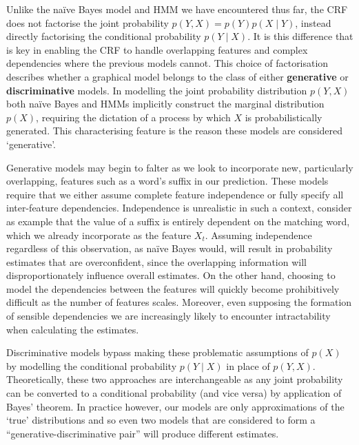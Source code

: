\documentclass[../main.tex]{subfiles}
\begin{document}

Unlike the na{\"i}ve Bayes model and HMM we have encountered thus far, the CRF does not factorise the joint probability $p(Y,X) = p(Y)p(X \mid Y)$, instead directly factorising the conditional probability $p(Y \mid X)$.
It is this difference that is key in enabling the CRF to handle overlapping features and complex dependencies where the previous models cannot.
This choice of factorisation describes whether a graphical model belongs to the class of either \textbf{generative} or \textbf{discriminative} models.
In modelling the joint probability distribution $p(Y,X)$ both na{\"i}ve Bayes and HMMs implicitly construct the marginal distribution $p(X)$, requiring the dictation of a process by which $X$ is probabilistically generated. This characterising feature is the reason these models are considered `generative'.

Generative models may begin to falter as we look to incorporate new, particularly overlapping, features such as a word's suffix in our prediction.
These models require that we either assume complete feature independence or fully specify all inter-feature dependencies.
Independence is unrealistic in such a context, consider as example that the value of a suffix is entirely dependent on the matching word, which we already incorporate as the feature $X_t$.
Assuming independence regardless of this observation, as na{\"i}ve Bayes would, will result in probability estimates that are overconfident, since the overlapping information will disproportionately influence overall estimates.
On the other hand, choosing to model the dependencies between the features will quickly become prohibitively difficult as the number of features scales. Moreover, even supposing the formation of sensible dependencies we are increasingly likely to encounter intractability when calculating the estimates.

Discriminative models bypass making these problematic assumptions of $p(X)$ by modelling the conditional probability $p(Y \mid X)$ in place of $p(Y,X)$.
Theoretically, these two approaches are interchangeable as any joint probability can be converted to a conditional probability (and vice versa) by application of Bayes' theorem.
In practice however, our models are only approximations of the `true' distributions and so even two models that are considered to form a ``generative-discriminative pair'' \autocite{andrew-generative-discriminative-2001} will produce different estimates.
\end{document}
